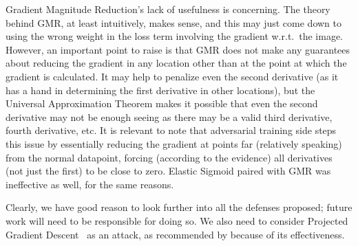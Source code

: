 Gradient Magnitude Reduction's lack of usefulness is concerning. The theory behind GMR, at least
intuitively, makes sense, and this may just come down to using the wrong weight in the loss term
involving the gradient w.r.t.\ the image. However, an important point to raise is that GMR does not
make any guarantees about reducing the gradient in any location other than at the point at which the
gradient is calculated. It may help to penalize even the second derivative (as it has a hand in
determining the first derivative in other locations), but the Universal Approximation
Theorem\cite{HORNIK1989359} makes it possible that even the second derivative may not be enough
seeing as there may be a valid third derivative, fourth derivative, etc. It is relevant to note that
adversarial training side steps this issue by essentially reducing the gradient at points far
(relatively speaking) from the normal datapoint, forcing (according to the evidence) all derivatives
(not just the first) to be close to zero. Elastic Sigmoid paired with GMR was ineffective as well,
for the same reasons.

Clearly, we have good reason to look further into all the defenses proposed; future work will need
to be responsible for doing so. We also need to consider Projected Gradient
Descent~\cite{madry2019deep} as an attack, as recommended by \cite{athalye2018obfuscated} because of
its effectiveness.